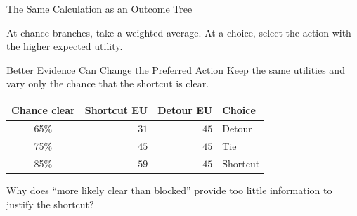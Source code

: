 \documentclass[aspectratio=169,10pt]{beamer}
\begin{document}
\begin{frame}{The Same Calculation as an Outcome Tree}
  \begin{center}
  \end{center}
  \begin{keyidea}
    At chance branches, take a weighted average. At a choice, select the action with the higher expected utility.
  \end{keyidea}
\end{frame}

\begin{frame}{Better Evidence Can Change the Preferred Action}
  Keep the same utilities and vary only the chance that the shortcut is clear.
  \begin{center}
    \renewcommand{\arraystretch}{1.5}
    \begin{tabular}{c|r|r|l}
      \textbf{Chance clear} & \textbf{Shortcut EU} & \textbf{Detour EU} & \textbf{Choice} \\\hline
      65\% & $31$ & $45$ & Detour \\
      75\% & $45$ & $45$ & Tie \\
      85\% & $59$ & $45$ & Shortcut
    \end{tabular}
  \end{center}
  \begin{activity}
    Why does ``more likely clear than blocked'' provide too little information to justify the shortcut?
  \end{activity}
\end{frame}
\end{document}
